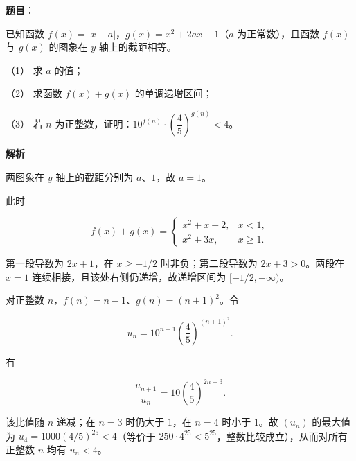 \begin{answer}

\textbf{题目}：

已知函数 $f(x)=|x-a|$，$g(x)=x^2+2ax+1$（$a$ 为正常数），且函数 $f(x)$ 与 $g(x)$ 的图象在 $y$ 轴上的截距相等。

（1） 求 $a$ 的值；

（2） 求函数 $f(x)+g(x)$ 的单调递增区间；

（3） 若 $n$ 为正整数，证明：$10^{f(n)}\cdot\left(\dfrac{4}{5}\right)^{g(n)}<4$。

\textbf{解析}


两图象在 $y$ 轴上的截距分别为 $a$、$1$，故 $a=1$。


此时

\nopagebreak[4]
\[f(x)+g(x)=\begin{cases}x^2+x+2,&x<1,\\x^2+3x,&x\ge1.\end{cases}\]

第一段导数为 $2x+1$，在 $x\ge-1/2$ 时非负；第二段导数为 $2x+3>0$。两段在 $x=1$ 连续相接，且该处右侧仍递增，故递增区间为 $[-1/2,+\infty)$。


对正整数 $n$，$f(n)=n-1$、$g(n)=(n+1)^2$。令

\nopagebreak[4]
\[u_n=10^{n-1}\left(\frac45\right)^{(n+1)^2}.\]

有

\nopagebreak[4]
\[\frac{u_{n+1}}{u_n}=10\left(\frac45\right)^{2n+3}.\]

该比值随 $n$ 递减；在 $n=3$ 时仍大于 $1$，在 $n=4$ 时小于 $1$。故 $(u_n)$ 的最大值为 $u_4=1000(4/5)^{25}<4$（等价于 $250\cdot4^{25}<5^{25}$，整数比较成立），从而对所有正整数 $n$ 均有 $u_n<4$。


\gkanswer{答案（2）：$[-\dfrac12,+\infty)$}


\end{answer}
